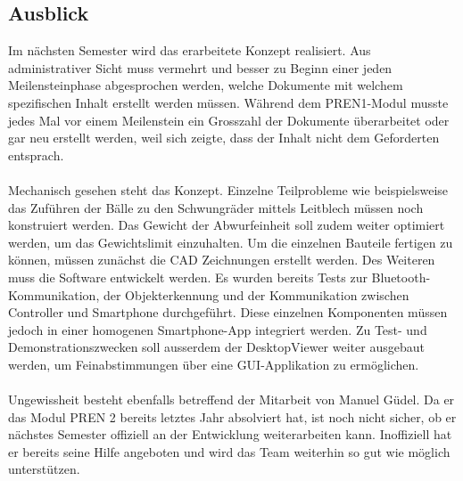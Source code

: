\subsection{Ausblick}
Im nächsten Semester wird das erarbeitete Konzept realisiert. Aus administrativer Sicht muss vermehrt und besser zu Beginn einer jeden Meilensteinphase abgesprochen werden, welche Dokumente mit welchem spezifischen Inhalt erstellt werden müssen. Während dem PREN1-Modul musste jedes Mal vor einem Meilenstein ein Grosszahl der Dokumente überarbeitet oder gar neu erstellt werden, weil sich zeigte, dass der Inhalt nicht dem Geforderten entsprach.\\
\\
Mechanisch gesehen steht das Konzept. Einzelne Teilprobleme wie beispielsweise das Zuführen der Bälle zu den Schwungräder mittels Leitblech müssen noch konstruiert werden. Das Gewicht der Abwurfeinheit soll zudem weiter optimiert werden, um das Gewichtslimit einzuhalten. Um die einzelnen Bauteile fertigen zu können, müssen zunächst die CAD Zeichnungen erstellt werden. Des Weiteren muss die Software entwickelt werden. Es wurden bereits Tests zur Bluetooth-Kommunikation, der Objekterkennung und der Kommunikation zwischen Controller und Smartphone durchgeführt. Diese einzelnen Komponenten müssen jedoch in einer homogenen Smartphone-App integriert werden. Zu Test- und Demonstrationszwecken soll ausserdem der DesktopViewer weiter ausgebaut werden, um Feinabstimmungen über eine GUI-Applikation zu ermöglichen.\\
\\
Ungewissheit besteht ebenfalls betreffend der Mitarbeit von Manuel Güdel. Da er das Modul PREN 2 bereits letztes Jahr absolviert hat, ist noch nicht sicher, ob er nächstes Semester offiziell an der Entwicklung weiterarbeiten kann. Inoffiziell hat er bereits seine Hilfe angeboten und wird das Team weiterhin so gut wie möglich unterstützen.

